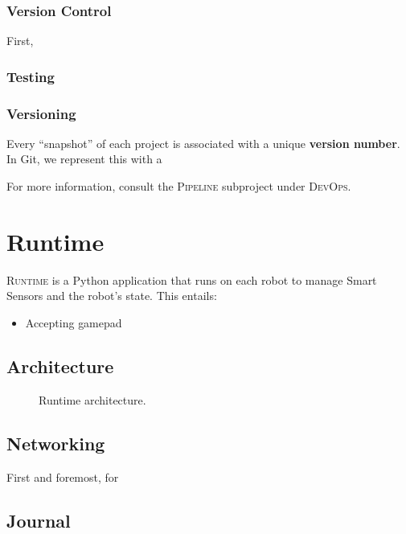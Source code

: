 \documentclass[12pt]{book}
\begin{document}
  \subsection{Version Control}

  First,

  \subsection{Testing}

  \subsection{Versioning}

  Every ``snapshot'' of each project is associated with a unique \textbf{version number}.
  In Git, we represent this with a

  For more information, consult the \textsc{Pipeline} subproject under \textsc{DevOps}.

  \chapter{Runtime}

  \textsc{Runtime} is a Python application that runs on each robot to manage Smart Sensors and the robot's state.
  This entails:
  \begin{itemize}
    \item Accepting \gls{gamepad}
  \end{itemize}

  \section{Architecture}

  \begin{figure}[!htbp]
    \centering
    \caption{Runtime architecture.}
    \label{fig:runtime-architecture}
  \end{figure}

  \section{Networking}

  First and foremost, for

  \section{Journal}
\end{document}
